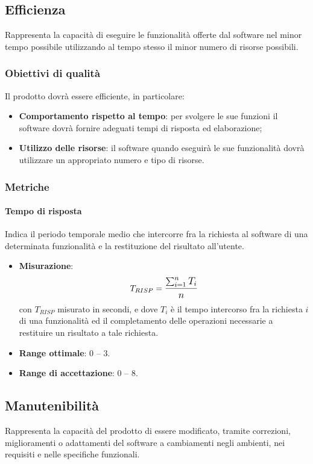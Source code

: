 \subsection{Efficienza}
\label{efficienza}
Rappresenta la capacità di eseguire le funzionalità offerte dal software nel minor tempo possibile utilizzando al tempo stesso il minor numero di risorse possibili.

\subsubsection{Obiettivi di qualità}
Il prodotto dovrà essere efficiente, in particolare:
\begin{itemize}
\item \textbf{Comportamento rispetto al tempo}:  per svolgere le sue funzioni il software dovrà fornire adeguati tempi di risposta ed elaborazione;
\item \textbf{Utilizzo delle risorse}: il software quando eseguirà le sue funzionalità dovrà utilizzare un appropriato numero e tipo di risorse.
\end{itemize}

\subsubsection{Metriche}
\paragraph{Tempo di risposta}
Indica il periodo temporale medio che intercorre fra la richiesta al software di una determinata funzionalità e la restituzione del risultato all'utente.
\begin{itemize}
	\item \textbf{Misurazione}: 
		$$T_{RISP} = \mathlarger{\frac{\sum_{i=1}^{n} T_{i}}{n}}$$ 
	con $T_{RISP}$ misurato in secondi, e dove $T_{i}$ è il tempo intercorso fra la richiesta $i$ di una funzionalità ed il completamento delle operazioni necessarie a restituire un risultato a tale richiesta.
	\item \textbf{Range ottimale}: 0 -- 3.
	\item \textbf{Range di accettazione}: 0 -- 8.
\end{itemize}

\subsection{Manutenibilità}
Rappresenta la capacità del prodotto di essere modificato, tramite correzioni, miglioramenti o adattamenti del software a cambiamenti negli ambienti, nei requisiti e nelle specifiche funzionali.

